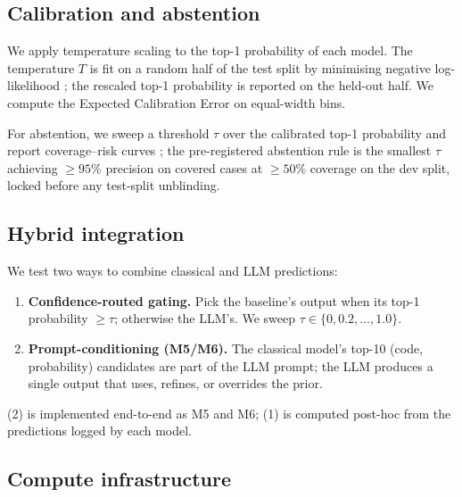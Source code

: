 \documentclass[preprint,authoryear,1p,12pt]{elsarticle}
\begin{document}
\subsection{Calibration and abstention}
\label{sec:calibration-method}

We apply temperature scaling \citep{guo2017calibration,platt2000probabilistic}
to the top-1 probability of each model. The temperature \(T\) is fit on
a random half of the test split by minimising negative log-likelihood
\citep{naeini2015obtaining}; the rescaled top-1 probability is reported
on the held-out half. We compute the Expected Calibration Error
\citep{naeini2015obtaining,nixon2019measuring} on equal-width bins.

For abstention, we sweep a threshold \(\tau\) over the calibrated top-1
probability and report coverage--risk curves
\citep{el2010foundations,geifman2017selective}; the pre-registered
abstention rule \citep{nosek2018preregistration} is the smallest
\(\tau\) achieving \(\geq 95\%\) precision on covered cases at
\(\geq 50\%\) coverage on the dev split, locked before any test-split
unblinding.

\subsection{Hybrid integration}
\label{sec:hybrid-method}

We test two ways to combine classical and LLM predictions:

\begin{enumerate}
    \item \textbf{Confidence-routed gating.} Pick the baseline's output
      when its top-1 probability \(\geq \tau\); otherwise the LLM's. We
      sweep \(\tau \in \{0, 0.2, \dots, 1.0\}\).
    \item \textbf{Prompt-conditioning (M5/M6).} The classical model's
      top-10 (code, probability) candidates are part of the LLM prompt;
      the LLM produces a single output that uses, refines, or
      overrides the prior.
\end{enumerate}

(2) is implemented end-to-end as M5 and M6; (1) is computed post-hoc
from the predictions logged by each model.

\subsection{Compute infrastructure}
\label{sec:compute}
\end{document}
